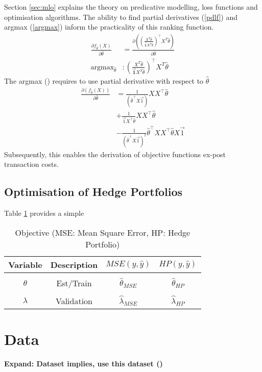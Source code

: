 \documentclass[12pt]{article}
\DeclareMathOperator*{\argmax}{argmax} %
\begin{document}
Section \ref{sec:mlo} explains the theory on predicative modelling, loss functions and optimisation algorithms.
The ability to find partial derivatives (\ref{pdlf}) and argmax (\ref{argmax}) inform the practicality of this ranking function.
\begin{align}
	\frac{\partial f_{\hat{\theta}}(X)}{\partial \hat{\theta}} &= \frac{\partial ((\frac{X^{T} \hat{\theta}}{\vec{\textbf{1}}X^{T} \hat{\theta}})^\top X^{T} \hat{\theta})}{\partial \hat{\theta}} \label{pdlf}\\
	\argmax_{\hat{\theta}} &: (\frac{X^{T} \hat{\theta}}{\vec{\textbf{1}}X^{T} \hat{\theta}})^\top X^{T} \hat{\theta} \label{argmax}
\end{align}
The argmax (\label{argmax}) requires to use partial derivative with respect to $\hat{\theta}$
\begin{align}
	\frac{\partial (f_{\hat{\theta}}(X))}{\partial \hat{\theta}}  &= \frac{1}{(\hat{\theta}^\top X \vec{1})} X X^\top \hat{\theta}\\
	&+\frac{1}{\vec{1}X^\top \hat{\theta}} XX^\top \hat{\theta}\\
	&-\frac{1}{(\hat{\theta}^\top X \vec{1})^{2}} \hat{\theta}^\top XX^\top \hat{\theta} X \vec{1}
\end{align}
Subsequently, this enables the derivation of objective functions ex-post transaction costs.
\subsection{Optimisation of Hedge Portfolios}
Table \ref{hpt} provides a simple 
	\begin{table}[H]
		\centering
		\begin{tabular}{||c|c|c|c||}
			\hline
			Variable & Description & $ MSE(y,\hat{y}) $ & $ HP(y,\hat{y}) $\\ [0.5ex]
			\hline
			&&&\\
			$\theta$ & Est/Train& $ \hat{\theta}_{MSE}$& $ \hat{\theta}_{HP}$ \\ [0.5ex]
			\hline
			&&&\\
			$\lambda$ & Validation & $\hat{\lambda}_{MSE}$ & $\hat{\lambda}_{HP}$\\ [1.0ex]
			\hline
		\end{tabular}
	\caption{Objective (MSE: Mean Square Error, HP: Hedge Portfolio)}
	\label{hpt}
\end{table}
\newpage

\section{Data}
\textbf{Expand: Dataset implies, use this dataset (\cite{jensen2021there})}
\end{document}
